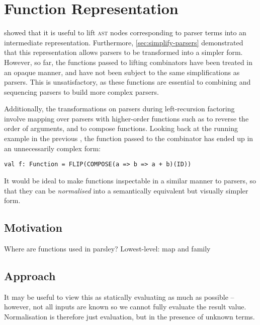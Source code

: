 \documentclass[../../main.tex]{subfiles}
\begin{document}
\section{Function Representation}\label{sec:function-representation}

 showed that it is useful to lift \textsc{ast} nodes corresponding to parser terms into an intermediate  representation.
Furthermore, \cref{sec:simplify-parsers} demonstrated that this representation allows parsers to be transformed into a simpler form.
However, so far, the functions passed to lifting combinators have been treated in an opaque manner, and have not been subject to the same simplifications as parsers.
This is unsatisfactory, as these functions are essential to combining and sequencing parsers to build more complex parsers.

Additionally, the transformations on parsers during left-recursion factoring involve mapping over parsers with higher-order functions such as  to reverse the order of arguments, and  to compose functions.
Looking back at the running example in the previous , the function passed to the  combinator has ended up in an unnecessarily complex form:
\begin{verbatim}
val f: Function = FLIP(COMPOSE(a => b => a + b)(ID))
\end{verbatim}
It would be ideal to make functions inspectable in a similar manner to parsers, so that they can be \emph{normalised} into a semantically equivalent but visually simpler form.

\subsection{Motivation}
Where are functions used in parsley?
Lowest-level: map and family

\subsection{Approach}

It may be useful to view this as statically evaluating as much as possible -- however, not all inputs are known so we cannot fully evaluate the result value.
Normalisation is therefore just evaluation, but in the presence of unknown terms.
\end{document}
